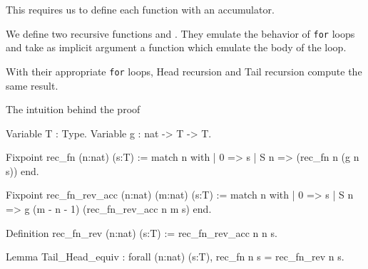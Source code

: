 This requires us to define each function with
an accumulator.

We define two recursive functions  and .
They emulate the behavior of \texttt{for} loops and take as implicit argument a
function  which emulate the body of the loop.
\begin{lemma}
With their appropriate \texttt{for} loops, Head recursion and Tail recursion
compute the same result.
\end{lemma}

The intuition behind the proof

\begin{Coq}
Variable T : Type.
Variable g : nat -> T -> T.

Fixpoint rec_fn (n:nat) (s:T) :=
  match n with
  | 0 => s
  | S n => (rec_fn n (g n s))
  end.

Fixpoint rec_fn_rev_acc (n:nat) (m:nat) (s:T) :=
  match n with
  | 0 => s
  | S n => g (m - n - 1) (rec_fn_rev_acc n m s)
  end.

Definition rec_fn_rev (n:nat) (s:T) :=
  rec_fn_rev_acc n n s.

Lemma Tail_Head_equiv :
  forall (n:nat) (s:T),
  rec_fn n s = rec_fn_rev n s.
\end{Coq}



